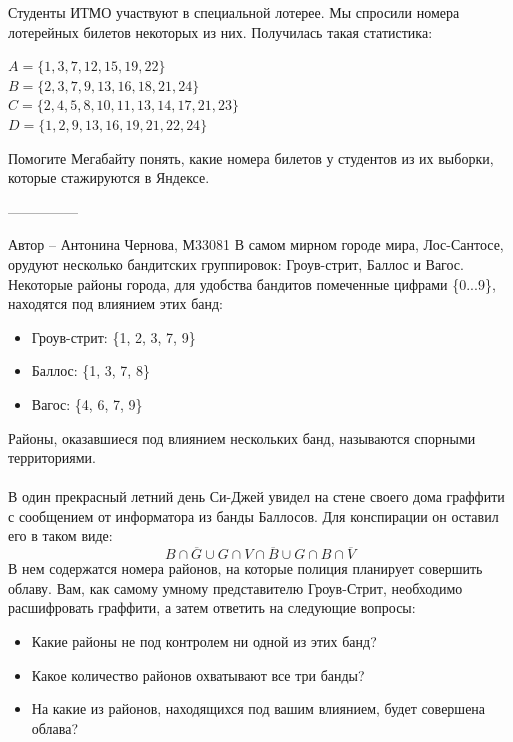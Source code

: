 \documentclass[10pt]{exam}
\begin{document}
\begin{questions}
Студенты ИТМО участвуют в специальной лотерее. Мы спросили номера лотерейных билетов некоторых из них. Получилась такая статистика:

\begin{center}
$A = \{1, 3, 7, 12, 15, 19, 22\}$
\\
$B = \{2, 3, 7, 9, 13, 16, 18, 21, 24\}$
\\
$C = \{2, 4, 5, 8, 10, 11, 13, 14, 17, 21, 23\}$
\\
$D = \{1, 2, 9, 13, 16, 19, 21, 22, 24\}$
\end{center}

Помогите Мегабайту понять, какие номера билетов у студентов из их выборки, которые стажируются в Яндексе.

---------------

Автор -- Антонина Чернова, М33081\question
В самом мирном городе мира, Лос-Сантосе, орудуют несколько бандитских группировок: Гроув-стрит, Баллос и Вагос. Некоторые районы города, для удобства бандитов помеченные цифрами \{0...9\}, находятся под влиянием этих банд:
\begin{itemize}
    \item Гроув-стрит: \{1, 2, 3, 7, 9\}
    \item Баллос: \{1, 3, 7, 8\}
    \item Вагос: \{4, 6, 7, 9\}
\end{itemize}
Районы, оказавшиеся под влиянием нескольких банд, называются спорными территориями.
\\
\\
В один прекрасный летний день Си-Джей увидел на стене своего дома граффити с сообщением от информатора из банды Баллосов. Для конспирации он оставил его в таком виде:
\begin{equation*}
B \cap \overline{G} \cup G \cap V \cap \overline{B} \cup G \cap B \cap \overline{V}
\end{equation*}
В нем содержатся номера районов, на которые полиция планирует совершить облаву. Вам, как самому умному представителю Гроув-Стрит, необходимо расшифровать граффити, а затем ответить на следующие вопросы:

\begin{itemize}
    \item Какие районы не под контролем ни одной из этих банд?
    \item Какое количество районов охватывают все три банды?
    \item На какие из районов, находящихся под вашим влиянием, будет совершена облава?
\end{itemize}


\end{questions}
\end{document}
